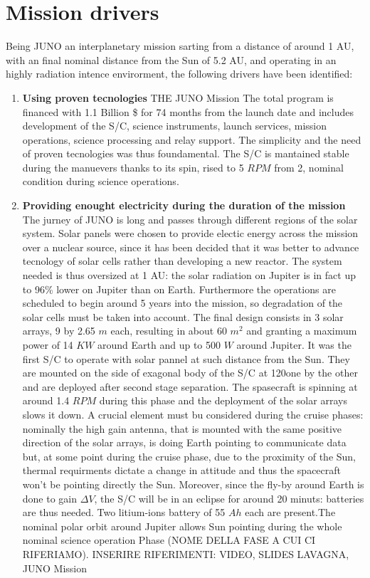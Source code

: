 \section{Mission drivers}
\label{sec:drivers}

Being JUNO an interplanetary mission sarting from a distance of around 1 AU, with an final nominal distance from the Sun of 5.2 AU, and operating in an highly radiation intence envirorment, the following drivers have been identified: 

\begin{enumerate}[leftmargin=1.5em]
    \item \textbf{Using proven tecnologies} THE JUNO Mission
    \newline The total program is financed with 1.1 Billion \$ for 74 months from the launch date and includes development of the S/C, science instruments, launch services, mission operations, science processing and relay support. The simplicity and the need of proven tecnologies was thus foundamental. The S/C is mantained stable during the manuevers thanks to its spin, rised to 5 $RPM$ from 2, nominal condition during science operations. 
    \item \textbf{Providing enought electricity during the duration of the mission} 
    \label{solar drivers}
    \newline The jurney of JUNO is long and passes through different regions of the solar system. Solar panels were chosen to provide electic energy across the mission over a nuclear source, since it has been decided that it was better to advance tecnology of solar cells rather than developing a new reactor. The system needed is thus oversized at 1 AU: the solar radiation on Jupiter is in fact up to 96\% lower on Jupiter than on Earth. Furthermore the operations are scheduled to begin around 5 years into the mission, so degradation of the solar cells must be taken into account. The final design consists in 3 solar arrays, 9 by 2.65 $m$ each, resulting in about 60 $m^2$ and granting a maximum power of 14 $KW$ around Earth and up to 500 $W$ around Jupiter. It was the first S/C to operate with solar pannel at such distance from the Sun. They are mounted on the side of exagonal body of the S/C at 120\textdegree one by the other and are deployed after second stage separation. The spasecraft is spinning at around 1.4 $RPM$ during this phase and the deployment of the solar arrays slows it down. A crucial element must bu considered during the cruise phases: nominally the high gain antenna, that is mounted with the same positive direction of the solar arrays, is doing Earth pointing to communicate data but, at some point during the cruise phase, due to the proximity of the Sun, thermal requirments dictate a change in attitude and thus the spacecraft won't be pointing directly the Sun. Moreover, since the fly-by around Earth is done to gain $\Delta V$, the S/C will be in an eclipse for around 20 minuts: batteries are thus needed. Two litium-ions battery of 55 $Ah$ each are present.The nominal polar orbit around Jupiter allows Sun pointing during the whole nominal science operation Phase (NOME DELLA FASE A CUI CI RIFERIAMO).              INSERIRE RIFERIMENTI: VIDEO, SLIDES LAVAGNA, JUNO Mission

\end{enumerate}
